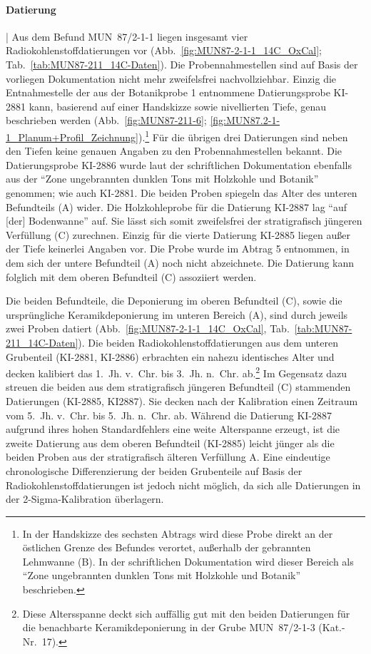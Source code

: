 \paragraph{Datierung}\hspace{-.5em}|\hspace{.5em}%
Aus dem Befund MUN~87/2-1-1 liegen insgesamt vier Radiokohlenstoffdatierungen vor (Abb.~\ref{fig:MUN87-2-1-1_14C_OxCal}; Tab.~\ref{tab:MUN87-211_14C-Daten}). Die Probennahmestellen sind auf Basis der vorliegen Dokumentation nicht mehr zweifelsfrei nachvollziehbar. Einzig die Entnahmestelle der aus der Botanikprobe 1 entnommene Datierungsprobe KI-2881 kann, basierend auf einer Handskizze sowie nivellierten Tiefe, genau beschrieben werden (Abb.~\ref{fig:MUN87-211-6}; \ref{fig:MUN87.2-1-1_Planum+Profil_Zeichnung}).\footnote{In der Handskizze des sechsten Abtrags wird diese Probe direkt an der östlichen Grenze des Befundes verortet, außerhalb der gebrannten Lehmwanne (B). In der schriftlichen Dokumentation wird dieser Bereich als \enquote{Zone ungebrannten dunklen Tons mit Holzkohle und Botanik} beschrieben.} Für die übrigen drei Datierungen sind neben den Tiefen keine genauen Angaben zu den Probennahmestellen bekannt. Die Datierungsprobe KI-2886 wurde laut der schriftlichen Dokumentation ebenfalls aus der \enquote{Zone ungebrannten dunklen Tons mit Holzkohle und Botanik} genommen; wie auch KI-2881. Die beiden Proben spiegeln das Alter des unteren Befundteils (A) wider. Die Holzkohleprobe für die Datierung KI-2887 lag \enquote{auf [der] Bodenwanne} auf. Sie lässt sich somit zweifelsfrei der stratigrafisch jüngeren Verfüllung (C) zurechnen. Einzig für die vierte Datierung KI-2885 liegen außer der Tiefe keinerlei Angaben vor. Die Probe wurde im Abtrag 5 entnommen, in dem sich der untere Befundteil (A) noch nicht abzeichnete. Die Datierung kann folglich mit dem oberen Befundteil (C) assoziiert werden.

Die beiden Befundteile, die Deponierung im oberen Befundteil (C), sowie die ursprüngliche Keramikdeponierung im unteren Bereich (A), sind durch jeweils zwei Proben datiert (Abb.~\ref{fig:MUN87-2-1-1_14C_OxCal}, Tab.~\ref{tab:MUN87-211_14C-Daten}). Die beiden Radiokohlenstoffdatierungen aus dem unteren Grubenteil (KI-2881, KI-2886) erbrachten ein nahezu identisches Alter und decken kalibiert das 1.~Jh. v.~Chr. bis 3.~Jh. n.~Chr. ab.\footnote{Diese Altersspanne deckt sich auffällig gut mit den beiden Datierungen für die benachbarte Keramikdeponierung in der Grube MUN~87/2-1-3 (Kat.-Nr.~17).} Im Gegensatz dazu streuen die beiden aus dem stratigrafisch jüngeren Befundteil (C) stammenden Datierungen (KI-2885, KI2887). Sie decken nach der Kalibration einen Zeitraum vom 5.~Jh. v.~Chr. bis 5.~Jh. n.~Chr. ab. Während die Datierung KI-2887 aufgrund ihres hohen Standardfehlers eine weite Alterspanne erzeugt, ist die zweite Datierung aus dem oberen Befundteil (KI-2885) leicht jünger als die beiden Proben aus der stratigrafisch älteren Verfüllung A. Eine eindeutige chronologische Differenzierung der beiden Grubenteile auf Basis der Radiokohlenstoffdatierungen ist jedoch nicht möglich, da sich alle Datierungen in der 2-Sigma-Kalibration überlagern.

